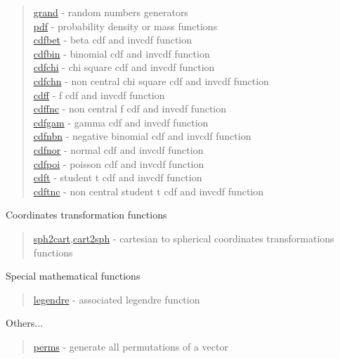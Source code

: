 \begin{quote}
\noindent
\hyperlink{grand}{grand} - random numbers generators \\
\hyperlink{pdf}{pdf} - probability density or mass functions \\
\hyperlink{cdfbet}{cdfbet} - beta cdf and invcdf function \\
\hyperlink{cdfbin}{cdfbin} - binomial cdf and invcdf function \\
\hyperlink{cdfchi}{cdfchi} - chi square cdf and invcdf function \\
\hyperlink{cdfchn}{cdfchn} - non central chi square cdf and invcdf function \\
\hyperlink{cdff}{cdff} - f cdf and invcdf function \\
\hyperlink{cdffnc}{cdffnc} - non central f cdf and invcdf function \\
\hyperlink{cdfgam}{cdfgam} - gamma cdf and invcdf function \\
\hyperlink{cdfnbn}{cdfnbn} - negative binomial cdf and invcdf function \\
\hyperlink{cdfnor}{cdfnor} - normal cdf and invcdf function \\
\hyperlink{cdfpoi}{cdfpoi} - poisson cdf and invcdf function \\
\hyperlink{cdft}{cdft} - student t cdf and invcdf function \\
\hyperlink{cdftnc}{cdftnc} - non central student t cdf and invcdf function \\
\end{quote}

Coordinates transformation functions

\begin{quote}
\noindent
\hyperlink{sph2cart}{sph2cart},\hyperlink{cart2sph}{cart2sph} -
cartesian to spherical coordinates transformations functions \\
\end{quote}


Special mathematical functions

\begin{quote}
\noindent
\hyperlink{legendre}{legendre} - associated legendre function\\
\end{quote}


Others...

\begin{quote}
\noindent
\hyperlink{perms}{perms} - generate all permutations of a vector\\
\end{quote}


